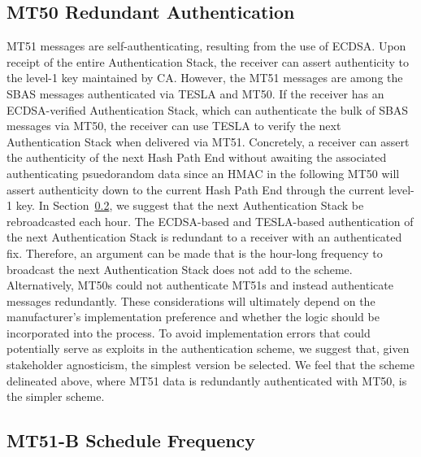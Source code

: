 \documentclass[letterpaper,times]{IONconf/IONconf}
\begin{document}
	\subsection{MT50 Redundant Authentication} \label{sub:mt50_redundant_authentication}

		MT51 messages are self-authenticating, resulting from the use of ECDSA.
		Upon receipt of the entire Authentication Stack, the receiver can assert authenticity to the level-1 key maintained by CA.
		However, the MT51 messages are among the SBAS messages authenticated via TESLA and MT50.
		If the receiver has an ECDSA-verified Authentication Stack, which can authenticate the bulk of SBAS messages via MT50, the receiver can use TESLA to verify the next Authentication Stack when delivered via MT51.
		Concretely, a receiver can assert the authenticity of the next Hash Path End without awaiting the associated authenticating psuedorandom data since an HMAC in the following MT50 will assert authenticity down to the current Hash Path End through the current level-1 key.
		In Section~\ref{sub:mt51_schedule_frequency}, we suggest that the next Authentication Stack be rebroadcasted each hour.
		The ECDSA-based and TESLA-based authentication of the next Authentication Stack is redundant to a receiver with an authenticated fix.
		Therefore, an argument can be made that is the hour-long frequency to broadcast the next Authentication Stack does not add to the scheme.
		Alternatively, MT50s could not authenticate MT51s and instead authenticate messages redundantly.
		These considerations will ultimately depend on the manufacturer's implementation preference and whether the logic should be incorporated into the process.
		To avoid implementation errors that could potentially serve as exploits in the authentication scheme, we suggest that, given stakeholder agnosticism, the simplest version be selected.
		We feel that the scheme delineated above, where MT51 data is redundantly authenticated with MT50, is the simpler scheme.

	\subsection{MT51-B Schedule Frequency} \label{sub:mt51_schedule_frequency}
\end{document}
